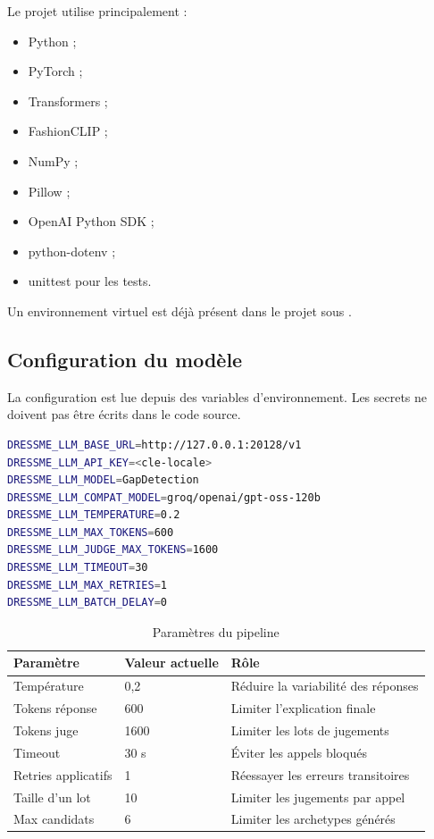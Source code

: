 \documentclass[11pt,a4paper]{article}
\newcommand{\pathcode}[1]{\texttt{\path{#1}}}
\begin{document}
Le projet utilise principalement :

\begin{itemize}[leftmargin=*]
    \item Python ;
    \item PyTorch ;
    \item Transformers ;
    \item FashionCLIP ;
    \item NumPy ;
    \item Pillow ;
    \item OpenAI Python SDK ;
    \item python-dotenv ;
    \item unittest pour les tests.
\end{itemize}

Un environnement virtuel est déjà présent dans le projet sous
\pathcode{.venv}.

\subsection{Configuration du modèle}

La configuration est lue depuis des variables d'environnement. Les secrets ne
doivent pas être écrits dans le code source.

\begin{lstlisting}[language=bash]
DRESSME_LLM_BASE_URL=http://127.0.0.1:20128/v1
DRESSME_LLM_API_KEY=<cle-locale>
DRESSME_LLM_MODEL=GapDetection
DRESSME_LLM_COMPAT_MODEL=groq/openai/gpt-oss-120b
DRESSME_LLM_TEMPERATURE=0.2
DRESSME_LLM_MAX_TOKENS=600
DRESSME_LLM_JUDGE_MAX_TOKENS=1600
DRESSME_LLM_TIMEOUT=30
DRESSME_LLM_MAX_RETRIES=1
DRESSME_LLM_BATCH_DELAY=0
\end{lstlisting}

\begin{table}[H]
\centering
\caption{Paramètres du pipeline}
\begin{tabular}{lll}
\toprule
\textbf{Paramètre} & \textbf{Valeur actuelle} & \textbf{Rôle} \\
\midrule
Température & 0,2 & Réduire la variabilité des réponses \\
Tokens réponse & 600 & Limiter l'explication finale \\
Tokens juge & 1600 & Limiter les lots de jugements \\
Timeout & 30 s & Éviter les appels bloqués \\
Retries applicatifs & 1 & Réessayer les erreurs transitoires \\
Taille d'un lot & 10 & Limiter les jugements par appel \\
Max candidats & 6 & Limiter les archetypes générés \\
\bottomrule
\end{tabular}
\end{table}
\end{document}
